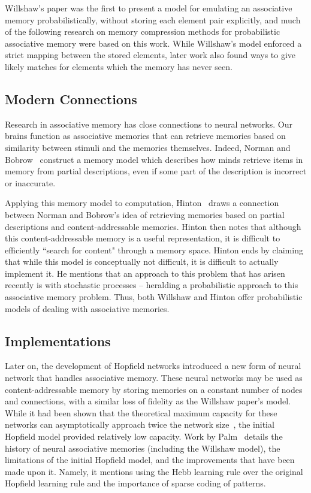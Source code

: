 \documentclass{sig-alternate}
\begin{document}
Willshaw's paper was the first to present a model for emulating an associative memory
probabilistically, without storing each element pair explicitly,
and much of the following research on memory compression methods
for probabilistic associative memory were based on this work. While Willshaw's model
enforced a strict mapping between the stored elements, later work also found ways to
give likely matches for elements which the memory has never seen.

\subsection{Modern Connections}
\label{subsec:modern}

Research in associative memory has close connections to neural networks. Our brains function as 
associative memories that can retrieve memories based on similarity between stimuli and the memories themselves. 
Indeed, Norman and Bobrow~\cite{bobrow} construct a memory model which describes how minds retrieve 
items in memory from partial descriptions, even if some part of the description is incorrect or inaccurate. 

Applying this memory model to computation, Hinton~\cite{hinton} draws a connection between Norman and Bobrow's idea of 
retrieving memories based on partial descriptions and content-addressable memories.
Hinton then notes that although this content-addressable memory is a useful representation,  
it is difficult to efficiently ``search for content" through a memory space. 
Hinton ends by claiming that while this model is conceptually not difficult, it is difficult to actually 
implement it. He mentions that an approach to this problem that has arisen recently is with stochastic processes 
-- heralding a probabilistic approach to this associative memory problem. Thus, both Willshaw and Hinton offer probabilistic models
of dealing with associative memories.

\subsection{Implementations}
\label{subsec:implementations}
Later on, the development of Hopfield networks introduced a new form of neural network
that handles associative memory. These neural networks may be used as content-addressable memory by
storing memories on a constant number of nodes and connections, with a similar loss of 
fidelity as the Willshaw paper's model. While it had been shown that the theoretical maximum capacity for these networks
can asymptotically approach twice the network size~\cite{gardner}, the initial Hopfield model 
provided relatively low capacity. Work by Palm~\cite{palm} details the history of 
neural associative memories (including the Willshaw model), the limitations of the initial Hopfield model, and the improvements
that have been made upon it. Namely, it mentions using the Hebb learning rule over the original
Hopfield learning rule and the importance of sparse coding of patterns. 
\end{document}
